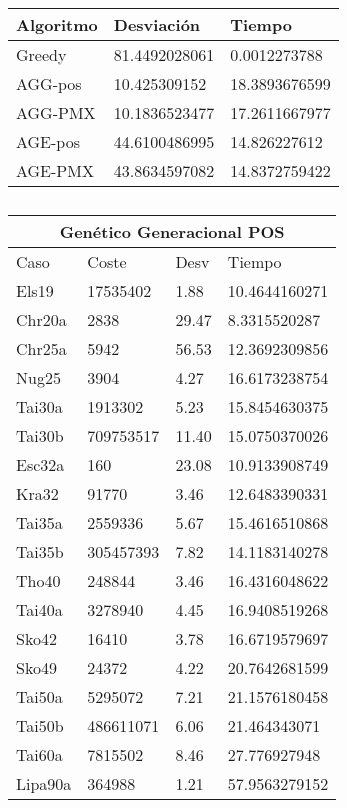 \documentclass[twoside]{article}
\begin{document}
\begin{table}[h]
\centering
    \begin{tabular}{lll}
    \toprule
    Algoritmo               & Desviación & Tiempo \\
    \midrule
    Greedy&81.4492028061&0.0012273788\\
    AGG-pos&10.425309152&18.3893676599\\
    AGG-PMX&10.1836523477&17.2611667977\\
    AGE-pos&44.6100486995&14.826227612\\
    AGE-PMX&43.8634597082&14.8372759422\\
    \bottomrule
    \end{tabular}
    \caption{}
\end{table}


\begin{table}[h]
\centering
    \begin{tabular}{llll}
    \hline
    \multicolumn{4}{c}{Genético Generacional POS} \\
    \toprule
    Caso               & Coste & Desv & Tiempo \\
    \midrule
    Els19&17535402&1.88&10.4644160271\\
    Chr20a&2838&29.47&8.3315520287\\
    Chr25a&5942&56.53&12.3692309856\\
    Nug25&3904&4.27&16.6173238754\\
    Tai30a&1913302&5.23&15.8454630375\\
    Tai30b&709753517&11.40&15.0750370026\\
    Esc32a&160&23.08&10.9133908749\\
    Kra32&91770&3.46&12.6483390331\\
    Tai35a&2559336&5.67&15.4616510868\\
    Tai35b&305457393&7.82&14.1183140278\\
    Tho40&248844&3.46&16.4316048622\\
    Tai40a&3278940&4.45&16.9408519268\\
    Sko42&16410&3.78&16.6719579697\\
    Sko49&24372&4.22&20.7642681599\\
    Tai50a&5295072&7.21&21.1576180458\\
    Tai50b&486611071&6.06&21.464343071\\
    Tai60a&7815502&8.46&27.776927948\\
    Lipa90a&364988&1.21&57.9563279152\\
    \bottomrule
    \end{tabular}
    \caption{}
\end{table}
\end{document}
